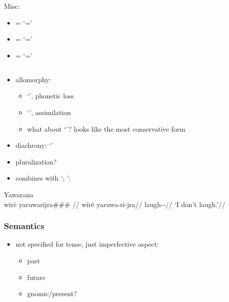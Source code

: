 \documentclass{memoir}
\begin{document}
Misc:

\begin{itemize}
\tightlist
\item
  = `='
\item
  = `='
\item
  = `='
\end{itemize}

\subsection{\texorpdfstring{ \label{sec:riipfv}}{ }}

\begin{itemize}
\tightlist
\item
  allomorphy:

  \begin{itemize}
  \tightlist
  \item
     `', phonetic loss
  \item
     `', assimilation
  \item
    what about  `'? looks like the most conservative
    form
  \end{itemize}
\item
  diachrony:  `'
\item
  pluralization?
\item
  combines with  `; ':
\end{itemize}

\ex Yawarana \\
\label{convrisamaj-04}    \begingl
    \glpreamble wïrë yaruwarijra\#\#\# //
    \gla wïrë yaruwa-ri-jra//
    \glb {} laugh--//
        \glft ‘I don’t laugh.’//  
    \endgl 
\xe

\subsubsection{Semantics}

\begin{itemize}
\tightlist
\item
  not specified for tense, just imperfective aspect:

  \begin{itemize}
  \tightlist
  \item
    past 
  \item
    future 
  \item
    gnomic/present? 
  \end{itemize}
\end{itemize}
\end{document}
